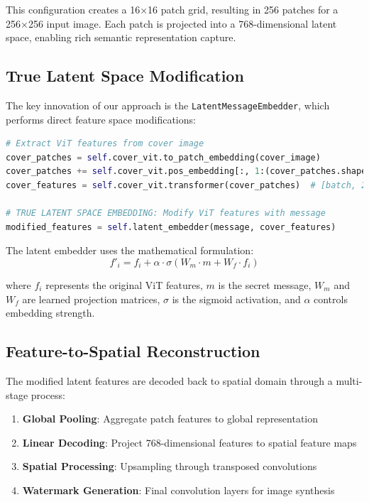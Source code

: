 \documentclass[12pt,a4paper]{report}
\begin{document}
This configuration creates a 16×16 patch grid, resulting in 256 patches for a 256×256 input image. Each patch is projected into a 768-dimensional latent space, enabling rich semantic representation capture.

\subsection{True Latent Space Modification}

The key innovation of our approach is the \texttt{LatentMessageEmbedder}, which performs direct feature space modifications:

\begin{lstlisting}[language=Python, caption=Latent Space Message Embedding]
# Extract ViT features from cover image
cover_patches = self.cover_vit.to_patch_embedding(cover_image)
cover_patches += self.cover_vit.pos_embedding[:, 1:(cover_patches.shape[1] + 1)]
cover_features = self.cover_vit.transformer(cover_patches)  # [batch, 256, 768]

# TRUE LATENT SPACE EMBEDDING: Modify ViT features with message
modified_features = self.latent_embedder(message, cover_features)
\end{lstlisting}

The latent embedder uses the mathematical formulation:
\begin{equation}
f'_{i} = f_i + \alpha \cdot \sigma(W_m \cdot m + W_f \cdot f_i)
\end{equation}

where $f_i$ represents the original ViT features, $m$ is the secret message, $W_m$ and $W_f$ are learned projection matrices, $\sigma$ is the sigmoid activation, and $\alpha$ controls embedding strength.

\subsection{Feature-to-Spatial Reconstruction}

The modified latent features are decoded back to spatial domain through a multi-stage process:

\begin{enumerate}
    \item \textbf{Global Pooling}: Aggregate patch features to global representation
    \item \textbf{Linear Decoding}: Project 768-dimensional features to spatial feature maps
    \item \textbf{Spatial Processing}: Upsampling through transposed convolutions
    \item \textbf{Watermark Generation}: Final convolution layers for image synthesis
\end{enumerate}
\end{document}
